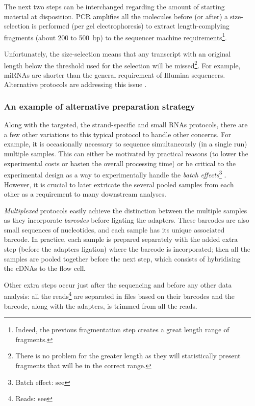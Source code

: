 The next two steps can be interchanged regarding the amount of starting material
at disposition. \gls{PCR} amplifies all the molecules before (or after)
a size-selection is performed (per gel electrophoresis) to extract
length-complying fragments (about 200 to 500\ bp) to the sequencer machine
requirements\footnote{Indeed, the previous fragmentation step creates a great
length range of fragments.}.\mybr\

Unfortunately, the size-selection means that any
transcript with an original length below the threshold used for the
selection will be missed\footnote{There is no problem for the greater length
as they will statistically present fragments that will be in the correct range.}.
For example, \glspl{miRNA} are shorter than the general requirement of Illumina
sequencers. Alternative protocols are addressing this issue
.\mybr\

\subsubsection{An example of alternative preparation strategy}
Along with the targeted, the strand-specific and small \glspl{RNA} protocols,
there are a few other variations to this typical protocol to handle other concerns.
For example, it is occasionally necessary to sequence simultaneously (in a single
run) multiple samples. This can either be motivated by practical reasons
(to lower the experimental costs or hasten the overall processing time)
 or be critical to the experimental design as a way to
experimentally handle the \emph{batch effects}\footnote{Batch effect: see
} . However, it is
crucial to later extricate the several pooled samples from each other as a
requirement to many downstream analyses.\mybr\

\emph{Multiplexed} protocols easily achieve
the distinction between the multiple samples as they incorporate \emph{barcodes}
before ligating the adapters. These barcodes are also small sequences of
nucleotides, and each sample has its unique associated
barcode. In practice, each sample is prepared separately with the added extra
step (before the adapters ligation) where the barcode is incorporated; then all
the samples are pooled together before the next step, which consists of hybridising
the \glspl{cDNA} to the flow cell.\mybr\

Other extra steps occur just after the sequencing and before any other data
analysis: all the reads\footnote{Reads: see } are
separated in files based on their barcodes and the barcode, along with the
adapters, is trimmed from all the reads.\mybr\

